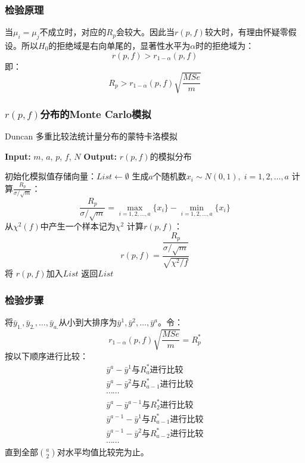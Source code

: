 \subsubsection{检验原理}
当$\mu_i=\mu_j$不成立时，对应的$R_p$会较大。因此当$r(p,f)$较大时，有理由怀疑零假设。所以$H_0$的拒绝域是右向单尾的，显著性水平为$\alpha$时的拒绝域为：
\begin{equation*}
	r(p,f)>r_{1-\alpha}(p,f)
\end{equation*}
即：
\begin{equation*}
	R_p>r_{1-\alpha}(p,f)\sqrt{\frac{MSe}{m}}
\end{equation*}
\subsubsection{$r(p,f)$分布的Monte Carlo模拟}
\begin{algorithm}
	\caption{Duncan 多重比较法统计量分布的蒙特卡洛模拟}
	\begin{algorithmic}[1]
		\State \textbf{Input:} $m$, $a$, $p$, $f$, $N$ 
		\State \textbf{Output:} $r(p,f)$的模拟分布
		
		\State 初始化模拟值存储向量：$List\gets\emptyset$
		\State 生成$a$个随机数$x_i\sim N(0,1),\;i=1,2,\dots,a$
		\State 计算$\frac{R_p}{\sigma/\sqrt{m}}$：
		\begin{equation*}
			\frac{R_p}{\sigma/\sqrt{m}}=\max\limits_{i=1,2,\dots,a}\{x_i\}-\min\limits_{i=1,2,\dots,a}\{x_i\}
		\end{equation*}
		\State 从$\chi^2(f)$中产生一个样本记为$\chi^2$
		\State 计算$r(p,f)$：
		\begin{equation*}
			r(p,f)=\frac{\dfrac{R_p}{\sigma/\sqrt{m}}}{\sqrt{\chi^2/f}}
		\end{equation*}
		\State 将 $r(p,f)$加入$List$
		\EndFor
		\State 返回$List$
	\end{algorithmic}
\end{algorithm}
\subsubsection{检验步骤}
将$\bar{y}_{1.},\bar{y}_{2.},\dots,\bar{y}_{a.}$从小到大排序为$\bar{y}^1,\bar{y}^2,\dots,\bar{y}^a$。令：
\begin{equation*}
	r_{1-\alpha}(p,f)\sqrt{\frac{MSe}{m}}=R_p^*
\end{equation*}
按以下顺序进行比较：
\begin{gather*}
	\bar{y}^a-\bar{y}^1\text{与$R_a^*$进行比较} \\
	\bar{y}^a-\bar{y}^2\text{与$R_{a-1}^*$进行比较} \\
	\cdots\cdots \\
	\bar{y}^a-\bar{y}^{a-1}\text{与$R_2^*$进行比较} \\
	\bar{y}^{a-1}-\bar{y}^1\text{与$R_{a-1}^*$进行比较} \\
	\bar{y}^{a-1}-\bar{y}^2\text{与$R_{a-2}^*$进行比较} \\
	\cdots\cdots
\end{gather*}
直到全部$\binom{a}{2}$对水平均值比较完为止。

